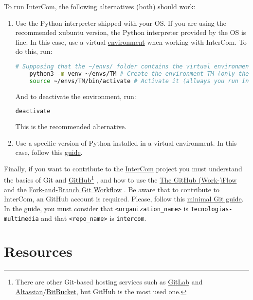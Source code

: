 To run InterCom, the following alternatives (both) should work:
\begin{enumerate}
\item Use the Python interpreter shipped with your OS. If you are
  using the recommended xubuntu version, the Python interpreter
  provided by the OS is fine. In this case, use a virtual
  \href{https://docs.python.org/3/library/venv.html}{environment} when
  working with InterCom. To do this, run:
  \begin{lstlisting}[language=Bash]
    # Supposing that the ~/envs/ folder contains the virtual environments 
    python3 -m venv ~/envs/TM # Create the environment TM (only the first time)
    source ~/envs/TM/bin/activate # Activate it (allways you run InterCom)
  \end{lstlisting}
  And to deactivate the environment, run:
  \begin{lstlisting}[language=Bash]
    deactivate
  \end{lstlisting}
  This is the recommended alternative.
  
\item Use a specific version of Python installed in a virtual environment. In this case, follow this 
\href{https://vicente-gonzalez-ruiz.github.io/Python_install/}{guide}.

\end{enumerate}

Finally, if you want to contribute to the
\href{https://github.com/Tecnologias-multimedia/intercom}{InterCom}
project \cite{intercom} you must understand the basics of Git
\cite{Git-book} and \href{https://github.com/}{GitHub}\footnote{There
are other Git-based hosting services such as
\href{https://about.gitlab.com/}{GitLab} and
\href{https://www.atlassian.com/git}{Altassian}/\href{https://bitbucket.org/product}{BitBucket},
but GitHub is the most used one.} \cite{GitHub}, and how to use the
\href{https://guides.github.com/introduction/flow/index.html}{The
  GitHub (Work-)Flow} and the
\href{https://github.com/vicente-gonzalez-ruiz/fork_and_branch_git_workflow}{Fork-and-Branch
  Git Workflow} \cite{fork-and-branch-git-workflow}. Be aware that to
contribute to InterCom, an GitHub account is required. Please, follow
this
\href{https://vicente-gonzalez-ruiz.github.io/using_GitHub/}{minimal
  Git guide}. In the guide, you must consider that
\texttt{<organization\_name>} is \texttt{Tecnologias-multimedia} and
that \texttt{<repo\_name>} is \texttt{intercom}.

\section{Resources}


